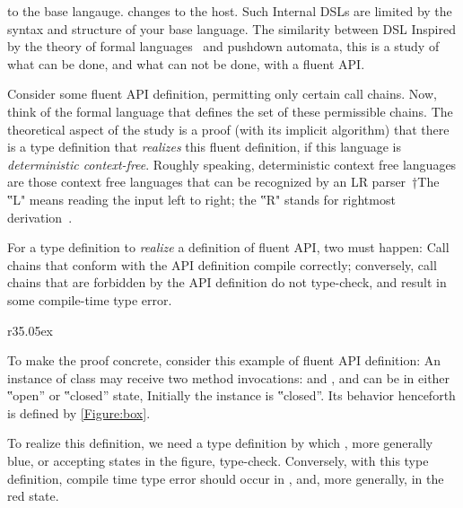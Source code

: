   to the base langauge.
  changes to the host. 
Such 
  Internal DSLs are limited by the syntax and structure of your base language.
The similarity between DSL
Inspired by the theory of formal languages~\cite{Linz:2001} and pushdown automata,
  this is a study of what can be done, and what can not be done, with a fluent API.

Consider some fluent API definition, permitting only certain call chains.
Now, think of the formal language that defines the set of these permissible chains.
The theoretical aspect of the study is a proof (with its implicit algorithm) that
  there is a \Java type definition that \emph{realizes} this fluent definition, if this
  language is \emph{deterministic context-free}.
Roughly speaking, deterministic context free languages are those context free languages that can be recognized
  by an LR parser~†{The ‟L" means reading the input left to right; the ‟R" stands for rightmost derivation}~\cite{Aho:86}.

For a type definition to \emph{realize} a definition of fluent API,
  two must happen: Call chains that conform with the API definition
  compile correctly; conversely, call chains that are forbidden by the API definition
  do not type-check, and result in some compile-time type error.

\begin{wrapfigure}[9]r{35.05ex}
\caption{\label{Figure:box}Fluent API of a box object, defined by a DFA}

  
\end{wrapfigure}

To make the proof concrete, consider this example of fluent API definition:
An instance of class 
may receive two method invocations:  and ,
and can be in either ‟open” or ‟closed” state,
Initially the instance is ‟closed”.
Its behavior henceforth is defined by \cref{Figure:box}.

To realize this definition, we need a type definition by which , more generally
  blue, or accepting states in the figure, type-check.
Conversely, with this type definition, compile time type error should occur in ,
  and, more generally, in the red state.

